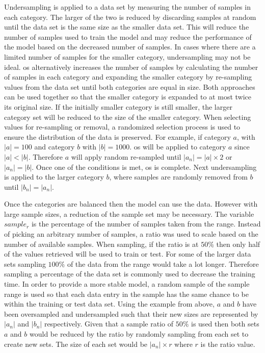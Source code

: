 Undersampling is applied to a data set by measuring the number of samples in each category. The larger of the two is reduced by discarding samples at random until the data set is the same size as the smaller data set. This will reduce the number of samples used to train the model and may reduce the performance of the model based on the decreased number of samples. In cases where there are a limited number of samples for the smaller category, undersampling may not be ideal. \gls{os} alternatively increases the number of samples by calculating the number of samples in each category and expanding the smaller category by re-sampling values from the data set until both categories are equal in size. Both approaches can be used together so that the smaller category is expanded to at most twice its original size. If the initially smaller category is still smaller, the larger category set will be reduced to the size of the smaller category. When selecting values for re-sampling or removal, a randomized selection process is used to ensure the distribution of the data is preserved. For example, if category $a$, with $|a| = 100$ and category $b$ with $|b| = 1000$. \gls{os} will be applied to category $a$ since $|a| < |b|$. Therefore $a$ will apply random re-sampled until $|a_n| = |a| \times 2$ or $|a_n| = |b|$. Once one of the conditions is met, \gls{os} is complete. Next undersampling is applied to the larger category $b$, where samples are randomly removed from $b$ until $|b_n| = |a_n|$.

Once the categories are balanced then the model can use the data. However with large sample sizes, a reduction of the sample set may be necessary. The variable $sample_r$ is the percentage of the number of samples taken from the range. Instead of picking an arbitrary number of samples, a ratio was used to scale based on the number of available samples. When sampling, if the ratio is at $50\%$ then only half of the values retrieved will be used to train or test. For some of the larger data sets sampling $100\%$ of the data from the range would take a lot longer. Therefore sampling a percentage of the data set is commonly used to decrease the training time. In order to provide a more stable model, a random sample of the sample range is used so that each data entry in the sample has the same chance to be within the training or test data set. Using the example from above, $a$ and $b$ have been oversampled and undersampled such that their new sizes are represented by $|a_n|$ and $|b_n|$ respectively. Given that a sample ratio of $50\%$ is used then both sets $a$ and $b$ would be reduced by the ratio by randomly sampling from each set to create new sets. The size of each set would be $|a_n| \times r$ where $r$ is the ratio value.

